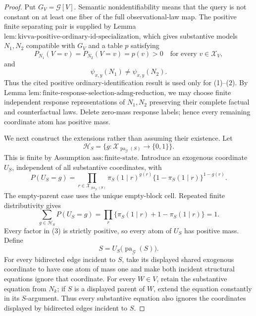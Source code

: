 \documentclass{article}
\begin{document}
\begin{proof}
Put \(G_V=\mathcal G[V]\). Semantic nonidentifiability means that the query is not constant on at least one fiber of the full observational-law map. The positive finite separating pair is supplied by Lemma \(\mathrm{lem{:}kivva\text{-}positive\text{-}ordinary\text{-}id\text{-}specialization}\), which gives substantive models \(N_1,N_2\) compatible with \(G_V\) and a table \(p\) satisfying
\[
 P_{N_1}(V=v)=P_{N_2}(V=v)=p(v)>0
 \quad\text{for every }v\in\mathcal X_V,
 \tag{1}
\]
and
\[
 \psi_{x,y}(N_1)\ne\psi_{x,y}(N_2).
 \tag{2}
\]
Thus the cited positive ordinary-identification result is used only for (1)--(2). By Lemma \(\mathrm{lem{:}finite\text{-}response\text{-}selection\text{-}admg\text{-}reduction}\), we may choose finite independent response representations of \(N_1,N_2\) preserving their complete factual and counterfactual laws. Delete zero-mass response labels; hence every remaining coordinate atom has positive mass.

We next construct the extensions rather than assuming their existence. Let
\[
 \mathcal H_S
 =\bigl\{g:\mathcal X_{\operatorname{pa}_{\mathcal G}(S)}\longrightarrow\{0,1\}\bigr\}.
\]
This is finite by Assumption \(\mathrm{ass{:}finite\text{-}state}\). Introduce an exogenous coordinate \(U_S\), independent of all substantive coordinates, with
\[
 P(U_S=g)
 =\prod_{r\in\mathcal X_{\operatorname{pa}_{\mathcal G}(S)}}
 \pi_S(1\mid r)^{g(r)}
 \{1-\pi_S(1\mid r)\}^{1-g(r)}.
 \tag{3}
\]
The empty-parent case uses the unique empty-block cell. Repeated finite distributivity gives
\[
 \sum_{g\in\mathcal H_S}P(U_S=g)
 =\prod_r\{\pi_S(1\mid r)+1-\pi_S(1\mid r)\}=1.
\]
Every factor in (3) is strictly positive, so every atom of \(U_S\) has positive mass. Define
\[
 S=U_S\bigl(\operatorname{pa}_{\mathcal G}(S)\bigr).
 \tag{4}
\]
For every bidirected edge incident to \(S\), take its displayed shared exogenous coordinate to have one atom of mass one and make both incident structural equations ignore that coordinate. For every \(W\in V\), retain the substantive equation from \(N_k\); if \(S\) is a displayed parent of \(W\), extend the equation constantly in its \(S\)-argument. Thus every substantive equation also ignores the coordinates displayed by bidirected edges incident to \(S\).


\end{proof}
\end{document}
